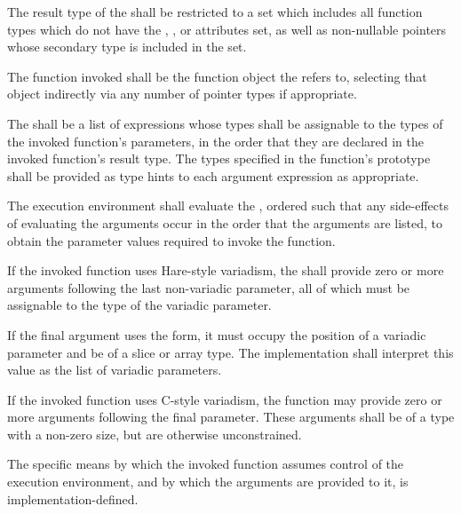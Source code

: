 \specsubsubitem
The result type of the  shall be restricted to a
set which includes all function types which do not have the ,
, or  attributes set, as well as non-nullable
pointers whose secondary type is included in the set.


\specsubsubitem
The function invoked shall be the function object the
 refers to, selecting that object indirectly via
any number of pointer types if appropriate.

\specsubsubitem
The  shall be a list of expressions whose types
shall be assignable to the types of the invoked function's parameters, in the
order that they are declared in the invoked function's result type. The types
specified in the function's prototype shall be provided as type hints to each
argument expression as appropriate.

\specsubsubitem
The execution environment shall evaluate the ,
ordered such that any side-effects of evaluating the arguments occur in the
order that the arguments are listed, to obtain the parameter values required to
invoke the function.

\specsubsubitem
If the invoked function uses Hare-style variadism, the
 shall provide zero or more arguments following the
last non-variadic parameter, all of which must be assignable to the type of the
variadic parameter.

\specsubsubitem
If the final argument uses the  form, it must occupy the position of a
variadic parameter and be of a slice or array type. The implementation shall
interpret this value as the list of variadic parameters.

\specsubsubitem
If the invoked function uses C-style variadism, the function may provide zero
or more arguments following the final parameter. These arguments shall be of a
type with a non-zero size, but are otherwise unconstrained.

\specsubsubitem
The specific means by which the invoked function assumes control of the
execution environment, and by which the arguments are provided to it, is
implementation-defined.


